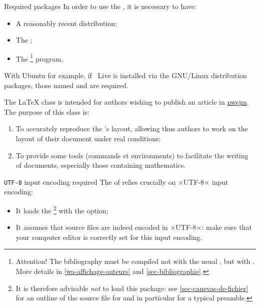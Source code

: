 \documentclass[english,nolocaltoc]{nwejmart}
\newtheorem[style=definition]{fact}
\newtheorem[title=experience]{experience}
\newtheorem[title-plural=rings]{ring}
\newtheorem[title=ideal,title-plural=ideals]{ideal}
\begin{document}
\begin{dbwarning}{Required packages}{}
  In order to use the \nwejmauthorcl{}, it is necessary to have:
  \begin{itemize}
  \item A reasonably recent  distribution;
  \item The ;
  \item The
    \href{https://www.ctan.org/pkg/biber}{}\footnote{Attention!
      The bibliography must be compiled not with the usual
      , but with . More details in
      \vref{wa-affichage-auteurs} and \vref{sec-bibliographie}.} program.
  \end{itemize}
  With Ubuntu for example, if ~Live is installed via the GNU/Linux distribution packages, those named  and
   are required.
\end{dbwarning}

The \LaTeX{} class \nwejmauthor{} is intended for authors wishing to publish an article in  \href{http://math.univ-lille1.fr/~nwejm/}{\gls{nwejm}}. The purpose of this class is:
\begin{enumerate}
\item To accurately reproduce the \nwejm{}'s layout, allowing thus authors to work on the layout of their document under real conditions;
\item To provide some tools (commands et environments) to facilitate the writing of documents, especially those containing mathematics.
\end{enumerate}

\begin{dbwarning}{\protect\lstinline+UTF-8+ input encoding required}{}
  The \nwejmauthorcl{} of \nwejm{} relies crucially on ×UTF-8× input encoding:
  \begin{itemize}
  \item It loads the \footnote{%
      It is therefore advisable \emph{not} to load this package: see \vref{sec-canevas-de-fichier} for an outline of the source file for \nwejm{} and in particular for a typical preamble.%
    }
    with the  option;
  \item It assumes that   source files are indeed encoded in ×UTF-8×: make sure that your computer editor is correctly set for this input encoding.
  \end{itemize}
\end{dbwarning}
\end{document}
